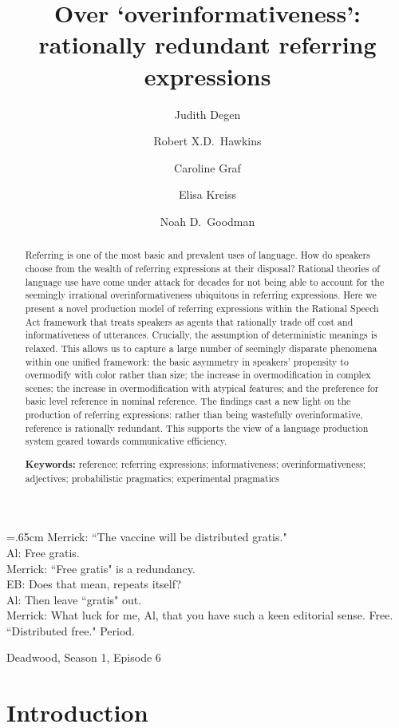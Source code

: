 \documentclass[11pt]{article}
\title{Over `overinformativeness': rationally redundant referring expressions}
\author{Judith Degen \and Robert X.D.~Hawkins \and Caroline Graf \and Elisa Kreiss \and Noah D.~Goodman}
\begin{document}
\maketitle


\begin{abstract}
Referring is one of the most basic and prevalent uses of language. How do speakers choose from the wealth of referring expressions at their disposal? Rational theories of language use have come under attack for decades for not being able to account for the seemingly irrational overinformativeness ubiquitous in referring expressions. Here we present a novel production model of referring expressions within the Rational Speech Act framework that treats speakers as agents that rationally trade off cost and informativeness of utterances. Crucially, the assumption of deterministic meanings is relaxed. This allows us to capture a large number of seemingly disparate phenomena within one unified framework: the basic asymmetry in speakers' propensity to overmodify with color rather than size; the increase in overmodification in complex scenes; the increase in overmodification with atypical features; and the preference for basic level reference in nominal reference. The findings cast a new light on the production of referring expressions: rather than being wastefully overinformative, reference is rationally redundant. This supports the view of a language production system geared towards communicative efficiency.

\textbf{Keywords:} 
reference; referring expressions; informativeness; overinformativeness; adjectives; probabilistic pragmatics; experimental pragmatics
\end{abstract}

\tableofcontents


\epigraph{\hangindent=.65cm Merrick: ``The vaccine will be distributed gratis."\\
Al: Free gratis.\\
Merrick: ``Free gratis" is a redundancy.\\
EB: Does that mean, repeats itself?\\
Al: Then leave ``gratis" out.\\
Merrick: What luck for me, Al, that you have such a keen editorial sense. Free. ``Distributed free." Period.}{Deadwood, Season 1, Episode 6}


\section{Introduction}
\label{sec:intro}
\end{document}
